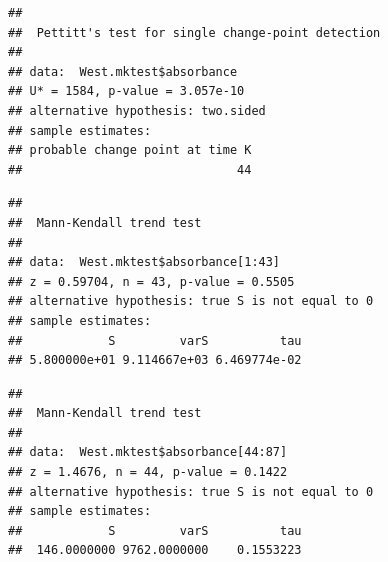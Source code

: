 \documentclass[12pt,]{article}
\newenvironment{Shaded}{\begin{snugshade}}{\end{snugshade}}
\newcommand{\KeywordTok}[1]{\textcolor[rgb]{0.13,0.29,0.53}{\textbf{#1}}}
\newcommand{\DecValTok}[1]{\textcolor[rgb]{0.00,0.00,0.81}{#1}}
\newcommand{\CommentTok}[1]{\textcolor[rgb]{0.56,0.35,0.01}{\textit{#1}}}
\newcommand{\OperatorTok}[1]{\textcolor[rgb]{0.81,0.36,0.00}{\textbf{#1}}}
\newcommand{\NormalTok}[1]{#1}
\begin{document}
\begin{Shaded}
\end{Shaded}

\begin{verbatim}
## 
##  Pettitt's test for single change-point detection
## 
## data:  West.mktest$absorbance
## U* = 1584, p-value = 3.057e-10
## alternative hypothesis: two.sided
## sample estimates:
## probable change point at time K 
##                              44
\end{verbatim}

\begin{Shaded}
\end{Shaded}

\begin{verbatim}
## 
##  Mann-Kendall trend test
## 
## data:  West.mktest$absorbance[1:43]
## z = 0.59704, n = 43, p-value = 0.5505
## alternative hypothesis: true S is not equal to 0
## sample estimates:
##            S         varS          tau 
## 5.800000e+01 9.114667e+03 6.469774e-02
\end{verbatim}

\begin{Shaded}
\end{Shaded}

\begin{verbatim}
## 
##  Mann-Kendall trend test
## 
## data:  West.mktest$absorbance[44:87]
## z = 1.4676, n = 44, p-value = 0.1422
## alternative hypothesis: true S is not equal to 0
## sample estimates:
##            S         varS          tau 
##  146.0000000 9762.0000000    0.1553223
\end{verbatim}
\end{document}
